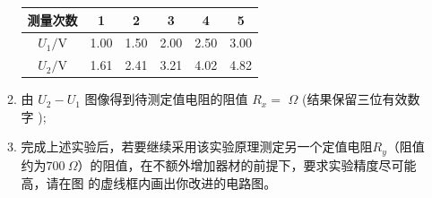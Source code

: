 \begin{enumerate}
\begin{enumerate}
\begin{table}[h!]
\centering 
\begin{tabular}{|c|c|c|c|c|c|}
\hline 测量次数 & 1 & 2 & 3 & 4 & 5 \\
\hline$U_{1} / \mathrm{V}$ & 1.00 & 1.50 & 2.00 & 2.50 & 3.00 \\
\hline$U_{2} / \mathrm{V}$ & 1.61 & 2.41 & 3.21 & 4.02 & 4.82 \\
\hline
\end{tabular}
\end{table} 

\begin{figure}[h!]
\centering
\begin{subfigure}{0.4\linewidth}
\centering
 
\caption{}\label{2020海南15a}
\end{subfigure}
\begin{subfigure}{0.4\linewidth}
\centering
 
\caption{}\label{2020海南15b}
\end{subfigure}

\end{figure}



\item 
由 $U_{2}-U_{1}$ 图像得到待测定值电阻的阻值 $R_{x}= $ \underlinegap $ \Omega$ (结果保留三位有效数字 );


\item 
完成上述实验后，若要继续采用该实验原理测定另一个定值电阻$ R_{y} $（阻值约为$ 700 \ \Omega $）的阻值，在不额外增加器材的前提下，要求实验精度尽可能高，请在图  的虚线框内画出你改进的电路图。







\end{enumerate}






\end{enumerate}
